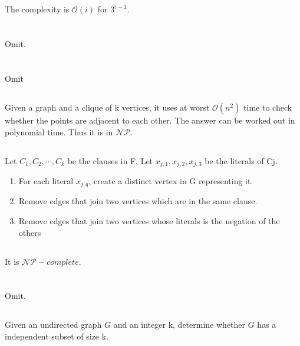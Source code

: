 \documentclass[12pt,a4paper]{article}
\theoremstyle{definition}
\begin{document}
\subsection{}
The complexity is $\mathcal{O}(i)$ for $3^{i-1}$.
\section{}
Omit.
\section{}
\subsection{}
Omit
\subsection{}
Given a graph and a clique of k vertices, it uses at worst $\mathcal{O}(n^2)$ time to check whether the points are adjacent to each
other. The answer can be worked out in polynomial time. Thus it is in $\mathcal{NP}$.
\subsection{}
Let $C_1,C_2,\cdots,C_k$ be the clauses in F. Let $x_{j,1}, x_{j,2}, x_{j,3}$ be the literals of Cj. 
\begin{enumerate}
    \item For each literal $x_{j,q}$, create a distinct vertex in G representing it.
    \item Remove edges that join two vertices which are in the same clause.
    \item Remove edges that join two vertices whose literals
    is the negation of the others
\end{enumerate}
\subsection{}
It is $\mathcal{NP}-complete$.
\section{}
\subsection{}
Omit.
\subsection{}
Given an undirected graph $G$ and an integer k, determine whether $G$ has a independent subset of size k.
\end{document}
